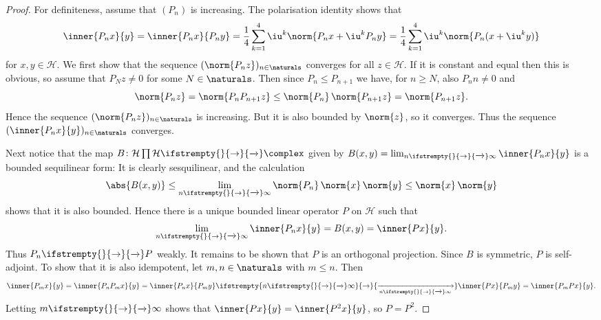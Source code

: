 \documentclass[article, a4paper, 11pt, oneside]{memoir}
\numberwithin{equation}{chapter}
\newcommand{\calH}{\mathcal{H}}
\renewcommand\to[1][]{%
    \ifstrempty{#1}{%
        \rightarrow
    }{%
        \xrightarrow[#1]{}
    }%
}
\begin{document}
\begin{proof}
    For definiteness, assume that $(P_n)$ is increasing. The polarisation identity shows that
    \begin{equation*}
        \inner{P_n x}{y}
            = \inner{P_n x}{P_n y}
            = \frac{1}{4} \sum_{k=1}^4 \iu^k \norm{P_n x + \iu^k P_n y}
            = \frac{1}{4} \sum_{k=1}^4 \iu^k \norm{P_n (x + \iu^k y)}
    \end{equation*}
    for $x,y \in \calH$. We first show that the sequence $(\norm{P_n z})_{n\in\naturals}$ converges for all $z \in \calH$. If it is constant and equal then this is obvious, so assume that $P_N z \neq 0$ for some $N \in \naturals$. Then since $P_n \leq P_{n+1}$ we have, for $n \geq N$, also $P_n n \neq 0$ and
    \begin{equation*}
        \norm{P_n z}
            = \norm{P_n P_{n+1} z}
            \leq \norm{P_n} \, \norm{P_{n+1} z}
            = \norm{P_{n+1} z}.
    \end{equation*}
    Hence the sequence $(\norm{P_n z})_{n\in\naturals}$ is increasing. But it is also bounded by $\norm{z}$, so it converges. Thus the sequence $(\inner{P_n x}{y})_{n\in\naturals}$ converges.

    Next notice that the map $B \colon \calH \prod \calH \to \complex$ given by $B(x,y) = \lim_{n\to\infty} \inner{P_n x}{y}$ is a bounded sequilinear form: It is clearly sesquilinear, and the calculation
    \begin{equation*}
        \abs{B(x,y)}
            \leq \lim_{n\to\infty} \norm{P_n} \, \norm{x} \, \norm{y}
            \leq \norm{x} \, \norm{y}
    \end{equation*}
    shows that it is also bounded. Hence there is a unique bounded linear operator $P$ on $\calH$ such that
    \begin{equation*}
        \lim_{n\to\infty} \inner{P_n x}{y}
            = B(x,y)
            = \inner{Px}{y}.
    \end{equation*}
    Thus $P_n \to P$ weakly. It remains to be shown that $P$ is an orthogonal projection. Since $B$ is symmetric, $P$ is self-adjoint. To show that it is also idempotent, let $m,n \in \naturals$ with $m \leq n$. Then
    \begin{equation*}
        \inner{P_m x}{y}
            = \inner{P_n P_m x}{y}
            = \inner{P_n x}{P_m y}
            \to[n\to\infty] \inner{Px}{P_m y}
            = \inner{P_m Px}{y}.
    \end{equation*}
    Letting $m \to \infty$ shows that $\inner{P x}{y} = \inner{P^2 x}{y}$, so $P = P^2$.
\end{proof}
\end{document}
